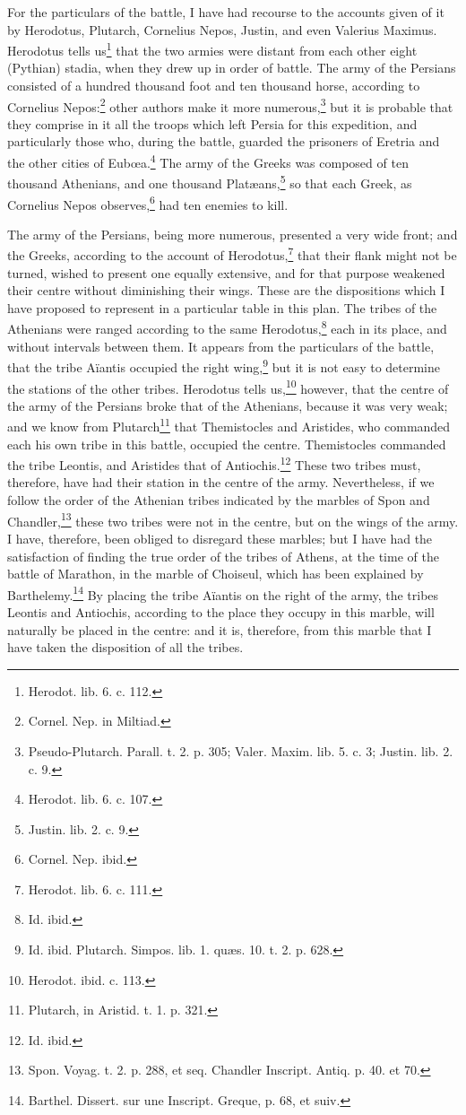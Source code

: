 \documentclass[a4paper, 11pt, oneside, polutonikogreek, english]{article}
\begin{document}
For the particulars of the battle, I have had recourse to the accounts given of it by Herodotus, Plutarch, Cornelius Nepos, Justin, and even Valerius Maximus. Herodotus tells us\footnote{Herodot. lib. 6. c. 112.} that the two armies were distant from each other eight (Pythian) stadia, when they drew up in order of battle. The army of the Persians consisted of a hundred thousand foot and ten thousand horse, according to Cornelius Nepos:\footnote{Cornel. Nep. in Miltiad.} other authors make it more numerous,\footnote{Pseudo-Plutarch. Parall. t. 2. p. 305; Valer. Maxim. lib. 5. c. 3; Justin. lib. 2. c. 9.} but it is probable that they comprise in it all the troops which left Persia for this expedition, and particularly those who, during the battle, guarded the prisoners of Eretria and the other cities of Eubœa.\footnote{Herodot. lib. 6. c. 107.} The army of the Greeks was composed of ten thousand Athenians, and one thousand Platæans,\footnote{Justin. lib. 2. c. 9.} so that each Greek, as Cornelius Nepos observes,\footnote{Cornel. Nep. ibid.} had ten enemies to kill.

The army of the Persians, being more numerous, presented a very wide front; and the Greeks, according to the account of Herodotus,\footnote{Herodot. lib. 6. c. 111.} that their flank might not be turned, wished to present one equally extensive, and for that purpose weakened their centre without diminishing their wings. These are the dispositions which I have proposed to represent in a particular table in this plan. The tribes of the Athenians were ranged according to the same Herodotus,\footnote{Id. ibid.} each in its place, and without intervals between them. It appears from the particulars of the battle, that the tribe Aïantis occupied the right wing,\footnote{Id. ibid. Plutarch. Simpos. lib. 1. quæs. 10. t. 2. p. 628.} but it is not easy to determine the stations of the other tribes. Herodotus tells us,\footnote{Herodot. ibid. c. 113.} however, that the centre of the army of the Persians broke that of the Athenians, because it was very weak; and we know from Plutarch\footnote{Plutarch, in Aristid. t. 1. p. 321.} that Themistocles and Aristides, who commanded each his own tribe in this battle, occupied the centre. Themistocles commanded the tribe Leontis, and Aristides that of Antiochis.\footnote{Id. ibid.} These two tribes must, therefore, have had their station in the centre of the army. Nevertheless, if we follow the order of the Athenian tribes indicated by the marbles of Spon and Chandler,\footnote{Spon. Voyag. t. 2. p. 288, et seq. Chandler Inscript. Antiq. p. 40. et 70.} these two tribes were not in the centre, but on the wings of the army. I have, therefore, been obliged to disregard these marbles; but I have had the satisfaction of finding the true order of the tribes of Athens, at the time of the battle of Marathon, in the marble of Choiseul, which has been explained by Barthelemy.\footnote{Barthel. Dissert. sur une Inscript. Greque, p. 68, et suiv.} By placing the tribe Aïantis on the right of the army, the tribes Leontis and Antiochis, according to the place they occupy in this marble, will naturally be placed in the centre: and it is, therefore, from this marble that I have taken the disposition of all the tribes.
\end{document}
